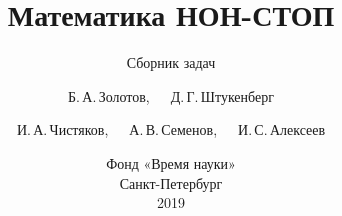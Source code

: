 \subject{\large\textrm{\ } %
	\vspace{0.8in}}

\title{\fontsize{25}{25}\selectfont
	Математика НОН-СТОП}
\subtitle{\fontsize{18}{18}\selectfont
	Сборник задач
	\vspace{1.05in}}

\author{Б.\,А.\,Золотов,\ \ \ Д.\,Г.\,Штукенберг \\
	\and И.\,А.\,Чистяков,\ \ \ А.\,В.\,Семенов,\ \ \ И.\,С.\,Алексеев
	\vspace{1.25in}}

\date{\normalsize Фонд «Время науки» \\ Санкт-Петербург \\ 2019}